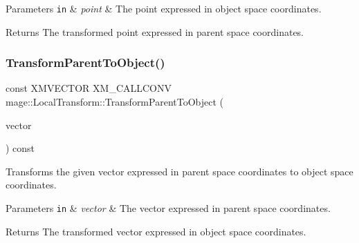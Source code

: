 \begin{DoxyParams}[1]{Parameters}
\mbox{\tt in}  & {\em point} & The point expressed in object space coordinates. \\
\hline
\end{DoxyParams}
\begin{DoxyReturn}{Returns}
The transformed point expressed in parent space coordinates. 
\end{DoxyReturn}
\hypertarget{classmage_1_1_local_transform_aee4c8c7b54e538a1448224bb36490d0a}{}\label{classmage_1_1_local_transform_aee4c8c7b54e538a1448224bb36490d0a} 
\subsubsection{\texorpdfstring{Transform\+Parent\+To\+Object()}{TransformParentToObject()}}
{\footnotesize\ttfamily const X\+M\+V\+E\+C\+T\+OR X\+M\+\_\+\+C\+A\+L\+L\+C\+O\+NV mage\+::\+Local\+Transform\+::\+Transform\+Parent\+To\+Object (\begin{DoxyParamCaption}\item[{F\+X\+M\+V\+E\+C\+T\+OR}]{vector }\end{DoxyParamCaption}) const\hspace{0.3cm}{\ttfamily [noexcept]}}

Transforms the given vector expressed in parent space coordinates to object space coordinates.


\begin{DoxyParams}[1]{Parameters}
\mbox{\tt in}  & {\em vector} & The vector expressed in parent space coordinates. \\
\hline
\end{DoxyParams}
\begin{DoxyReturn}{Returns}
The transformed vector expressed in object space coordinates. 
\end{DoxyReturn}
\hypertarget{classmage_1_1_local_transform_a237b0811672ffc8dd611e6a56af24c18}{}\label{classmage_1_1_local_transform_a237b0811672ffc8dd611e6a56af24c18} 

